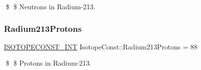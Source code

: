 \$ \$ Neutrons in Radium-\/213. \mbox{\label{group___isotope_const-_radium-_ra213_ga08c848255015bba8872be753ed3e735a}} 
\subsubsection{\texorpdfstring{Radium213\+Protons}{Radium213Protons}}
{\footnotesize\ttfamily \mbox{\hyperlink{group___isotope_const-_macros_ga5f18360b3e99483a35c32d789e62621c}{I\+S\+O\+T\+O\+P\+E\+C\+O\+N\+S\+T\+\_\+\+I\+NT}} Isotope\+Const\+::\+Radium213\+Protons = 88}

\$ \$ Protons in Radium-\/213. 
